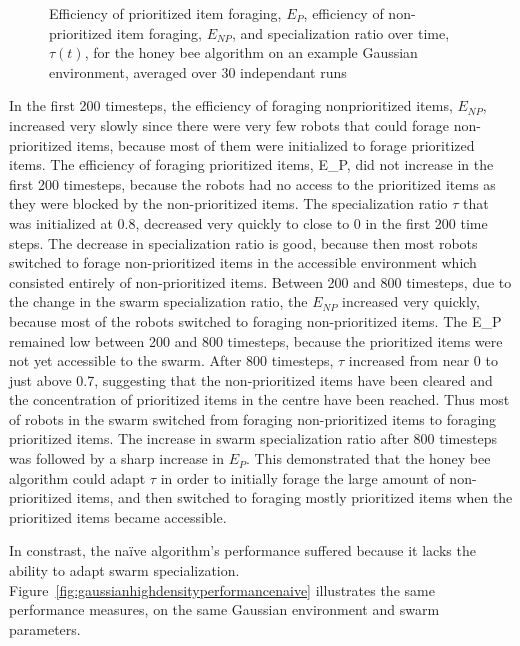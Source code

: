\begin{figure}[!htb]
\centering
\small
\resizebox{\textwidth}{!}{}
\caption{Efficiency of prioritized item foraging, $E_P$, efficiency of non-prioritized item foraging, $E_{NP}$, and specialization ratio over time, $\tau(t)$, for the honey bee algorithm on an example Gaussian environment, averaged over 30 independant runs}
\label{fig:gaussianhighdensityperformancehoneybee}
\end{figure}

In the first 200 timesteps, the efficiency of foraging nonprioritized items, $E_{NP}$, increased very slowly since there were very few robots that could forage non-prioritized items, because most of them were initialized to forage prioritized items. The efficiency of foraging prioritized items, E_{P}, did not increase in the first 200 timesteps, because the robots had no access to the prioritized items as they were blocked by the non-prioritized items. The specialization ratio $\tau$ that was initialized at 0.8, decreased very quickly to close to 0 in the first 200 time steps. The decrease in specialization ratio is good, because then most robots switched to forage non-prioritized items in the accessible environment which consisted entirely of non-prioritized items. Between 200 and 800 timesteps, due to the change in the swarm specialization ratio, the $E_{NP}$ increased very quickly, because most of the robots switched to foraging non-prioritized items. The E_{P} remained low between 200 and 800 timesteps, because the prioritized items were not yet accessible to the swarm. After 800 timesteps, $\tau$ increased from near 0 to just above 0.7, suggesting that the non-prioritized items have been cleared and the concentration of prioritized items in the centre have been reached. Thus most of robots in the swarm switched from foraging non-prioritized items to foraging prioritized items. The increase in swarm specialization ratio after 800 timesteps was followed by a sharp increase in $E_P$. This demonstrated that the honey bee algorithm could adapt $\tau$ in order to initially forage the large amount of non-prioritized items, and then switched to foraging mostly prioritized items when the prioritized items became accessible.

In constrast, the na\"ive algorithm's performance suffered because it lacks the ability to adapt swarm specialization. Figure~\ref{fig:gaussianhighdensityperformancenaive} illustrates the same performance measures, on the same Gaussian environment and swarm parameters. 

